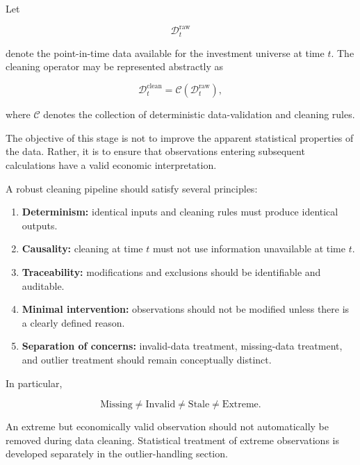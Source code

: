 \documentclass[11pt,a4paper]{article}
\begin{document}
Let

\begin{equation}
\mathcal{D}_t^{\mathrm{raw}}
\end{equation}

denote the point-in-time data available for the investment universe at time
$t$. The cleaning operator may be represented abstractly as

\begin{equation}
\boxed{
\mathcal{D}_t^{\mathrm{clean}}
=
\mathcal{C}
\left(
\mathcal{D}_t^{\mathrm{raw}}
\right),
}
\end{equation}

where $\mathcal{C}$ denotes the collection of deterministic data-validation and
cleaning rules.

The objective of this stage is not to improve the apparent statistical
properties of the data. Rather, it is to ensure that observations entering
subsequent calculations have a valid economic interpretation.

A robust cleaning pipeline should satisfy several principles:

\begin{enumerate}
    \item \textbf{Determinism:} identical inputs and cleaning rules must produce
    identical outputs.

    \item \textbf{Causality:} cleaning at time $t$ must not use information
    unavailable at time $t$.

    \item \textbf{Traceability:} modifications and exclusions should be
    identifiable and auditable.

    \item \textbf{Minimal intervention:} observations should not be modified
    unless there is a clearly defined reason.

    \item \textbf{Separation of concerns:} invalid-data treatment, missing-data
    treatment, and outlier treatment should remain conceptually distinct.
\end{enumerate}

In particular,

\begin{equation}
\boxed{
\text{Missing}
\neq
\text{Invalid}
\neq
\text{Stale}
\neq
\text{Extreme}.
}
\end{equation}

An extreme but economically valid observation should not automatically be
removed during data cleaning. Statistical treatment of extreme observations is
developed separately in the outlier-handling section.
\end{document}
